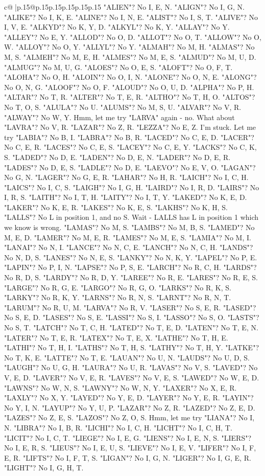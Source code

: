 \documentclass{article}
\begin{document}
{\begin{supertabular}{c@{$\;$}|p{.15\linewidth}@{}p{.15\linewidth}p{.15\linewidth}p{.15\linewidth}p{.15\linewidth}p{.15\linewidth}}
{{{"ALIEN"? No I, E, N. "ALIGN"? No I, G, N. "ALIKE"? No I, K, E. "ALINE"? No I, N, E. "ALIST"? No I, S, T. "ALIVE"? No I, V, E. "ALKYD"? No K, Y, D. "ALKYL"? No K, Y. "ALLAY"? No Y. "ALLEY"? No E, Y. "ALLOD"? No O, D. "ALLOT"? No O, T. "ALLOW"? No O, W. "ALLOY"? No O, Y. "ALLYL"? No Y. "ALMAH"? No M, H. "ALMAS"? No M, S. "ALMEH"? No M, E, H. "ALMES"? No M, E, S. "ALMUD"? No M, U, D. "ALMUG"? No M, U, G. "ALOES"? No O, E, S. "ALOFT"? No O, F, T. "ALOHA"? No O, H. "ALOIN"? No O, I, N. "ALONE"? No O, N, E. "ALONG"? No O, N, G. "ALOOF"? No O, F. "ALOUD"? No O, U, D. "ALPHA"? No P, H. "ALTAR"? No T, R. "ALTER"? No T, E, R. "ALTHO"? No T, H, O. "ALTOS"? No T, O, S. "ALULA"? No U. "ALUMS"? No M, S, U. "ALVAR"? No V, R. "ALWAY"? No W, Y. Hmm, let me try "LARVA" again {-} no. What about "LAVRA"? No V, R. "LAZAR"? No Z, R. "LEZZA"? No E, Z. I'm stuck. Let me try "LABIA"? No B, I. "LABRA"? No B, R. "LACED"? No C, E, D. "LACER"? No C, E, R. "LACES"? No C, E, S. "LACEY"? No C, E, Y. "LACKS"? No C, K, S. "LADED"? No D, E. "LADEN"? No D, E, N. "LADER"? No D, E, R. "LADES"? No D, E, S. "LADLE"? No D, E. "LAEVO"? No E, V, O. "LAGAN"? No G, N. "LAGER"? No G, E, R. "LAHAR"? No H, R. "LAICH"? No I, C, H. "LAICS"? No I, C, S. "LAIGH"? No I, G, H. "LAIRD"? No I, R, D. "LAIRS"? No I, R, S. "LAITH"? No I, T, H. "LAITY"? No I, T, Y. "LAKED"? No K, E, D. "LAKER"? No K, E, R. "LAKES"? No K, E, S. "LAKHS"? No K, H, S. "LALLS"? No L in position 1, and no S. Wait {-} LALLS has L in position 1 which we know is wrong. "LAMAS"? No M, S. "LAMBS"? No M, B, S. "LAMED"? No M, E, D. "LAMER"? No M, E, R. "LAMES"? No M, E, S. "LAMIA"? No M, I. "LANAI"? No N, I. "LANCE"? No N, C, E. "LANCH"? No N, C, H. "LANDS"? No N, D, S. "LANES"? No N, E, S. "LANKY"? No N, K, Y. "LAPEL"? No P, E. "LAPIN"? No P, I, N. "LAPSE"? No P, S, E. "LARCH"? No R, C, H. "LARDS"? No R, D, S. "LARDY"? No R, D, Y. "LAREE"? No R, E. "LARES"? No R, E, S. "LARGE"? No R, G, E. "LARGO"? No R, G, O. "LARKS"? No R, K, S. "LARKY"? No R, K, Y. "LARNS"? No R, N, S. "LARNT"? No R, N, T. "LARUM"? No R, U, M. "LARVA"? No R, V. "LASER"? No S, E, R. "LASED"? No S, E, D. "LASES"? No S, E. "LASSI"? No S, I. "LASSO"? No S, O. "LASTS"? No S, T. "LATCH"? No T, C, H. "LATED"? No T, E, D. "LATEN"? No T, E, N. "LATER"? No T, E, R. "LATEX"? No T, E, X. "LATHE"? No T, H, E. "LATHI"? No T, H, I. "LATHS"? No T, H, S. "LATHY"? No T, H, Y. "LATKE"? No T, K, E. "LATTE"? No T, E. "LAUAN"? No U, N. "LAUDS"? No U, D, S. "LAUGH"? No U, G, H. "LAURA"? No U, R. "LAVAS"? No V, S. "LAVED"? No V, E, D. "LAVER"? No V, E, R. "LAVES"? No V, E, S. "LAWED"? No W, E, D. "LAWNS"? No W, N, S. "LAWNY"? No W, N, Y. "LAXER"? No X, E, R. "LAXLY"? No X, Y. "LAYED"? No Y, E, D. "LAYER"? No Y, E, R. "LAYIN"? No Y, I, N. "LAYUP"? No Y, U, P. "LAZAR"? No Z, R. "LAZED"? No Z, E, D. "LAZES"? No Z, E, S. "LAZOS"? No Z, O, S. Hmm, let me try "LIANA"? No I, N. "LIBRA"? No I, B, R. "LICHI"? No I, C, H. "LICHT"? No I, C, H, T. "LICIT"? No I, C, T. "LIEGE"? No I, E, G. "LIENS"? No I, E, N, S. "LIERS"? No I, E, R, S. "LIEUS"? No I, E, U, S. "LIEVE"? No I, E, V. "LIFER"? No I, F, E, R. "LIFTS"? No I, F, T, S. "LIGAN"? No I, G, N. "LIGER"? No I, G, E, R. "LIGHT"? No I, G, H, T. }}}
\end{supertabular}}
\end{document}
